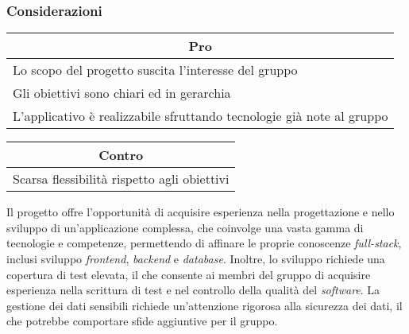 \subsubsection{Considerazioni}
\begin{minipage}[t]{0.45\linewidth}
    \vspace{0pt}
    {\renewcommand{\arraystretch}{1.5}
    \begin{tabular}{p{1\linewidth}}
        \multicolumn{1}{c}{\textbf{Pro}} \\
        \midrule
        Lo scopo del progetto suscita l'interesse del gruppo \\
        Gli obiettivi sono chiari ed in gerarchia \\
        L'applicativo è realizzabile sfruttando tecnologie già note al gruppo \\
        \hline
    \end{tabular}
    }
\end{minipage}
\hspace{0.05\linewidth}
\begin{minipage}[t]{0.45\linewidth}
    \vspace{0pt}
    {\renewcommand{\arraystretch}{1.5}
    \begin{tabular}{p{1\linewidth}}
        \multicolumn{1}{c}{\textbf{Contro}} \\
        \midrule
        Scarsa flessibilità rispetto agli obiettivi \\
        \hline
    \end{tabular}
    }
\end{minipage}
\vspace{1em}

Il progetto offre l'opportunità di acquisire esperienza nella progettazione e nello sviluppo di un'applicazione complessa, che coinvolge una vasta gamma di tecnologie e competenze, permettendo di affinare le proprie conoscenze \textit{full-stack}, inclusi sviluppo \textit{frontend}, \textit{backend} e \textit{database}.
Inoltre, lo sviluppo richiede una copertura di test elevata, il che consente ai membri del gruppo di acquisire esperienza nella scrittura di test e nel controllo della qualità del \textit{software}.
La gestione dei dati sensibili richiede un'attenzione rigorosa alla sicurezza dei dati, il che potrebbe comportare sfide aggiuntive per il gruppo.
